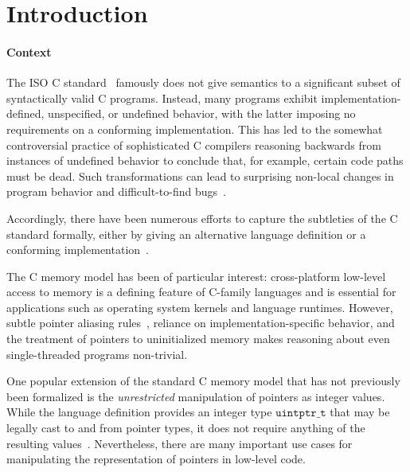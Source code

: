 \section{Introduction}
%

\paragraph{Context}

The ISO C standard~\cite{iso2011iec} famously does not give semantics to a significant
subset of syntactically valid C programs. Instead, many programs
exhibit implementation-defined, unspecified, or undefined behavior,
with the latter imposing no requirements on a conforming
implementation. This has led to the somewhat controversial practice of
sophisticated C compilers reasoning backwards from instances of
undefined behavior to conclude that, for example, certain code paths
must be dead. Such transformations can lead to surprising non-local
changes in program behavior and difficult-to-find bugs~\cite{wang2013towards,yang2011finding}.

Accordingly, there have been numerous efforts to capture the
subtleties of the C standard formally, either by giving an alternative
language definition or a conforming implementation~\cite{norrish1998c,leroy:compcert,ellison2012executable}.

 The C memory model has been of
particular interest: cross-platform low-level access to memory is a
defining feature of C-family languages and is essential for
applications such as operating system kernels and language
runtimes. However, subtle pointer aliasing
rules~\cite{krebbers2013aliasing}, reliance on implementation-specific
behavior, and the treatment of pointers to uninitialized memory makes
reasoning about even single-threaded programs non-trivial.

One popular extension of the standard C memory model that has not
previously been formalized is the \emph{unrestricted} manipulation of
pointers as integer values. While the language definition provides an integer
type $\mathtt{uintptr\_t}$ that may be legally cast to and from pointer
types, it does not require anything of the resulting values~\cite[\S7.20.1.4p1]{iso2011iec}. 
Nevertheless, there are many important use cases for manipulating
the representation of pointers in low-level code.

